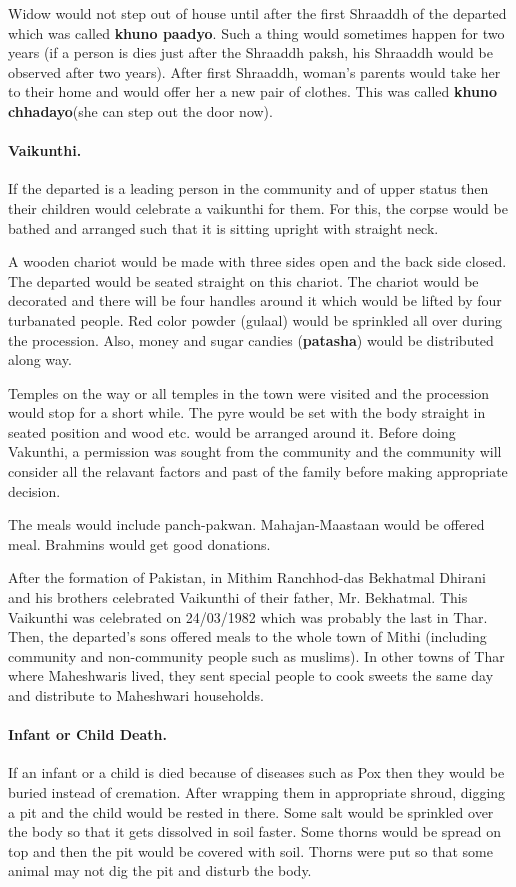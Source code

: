 Widow would not step out of house until after the first Shraaddh of the
departed which was called \textbf{khuno paadyo}. Such a thing would sometimes
happen for two years (if a person is dies just after the Shraaddh paksh, his
Shraaddh would be observed after two years). After first Shraaddh, woman's
parents would take her to their home and would offer her a new pair of clothes.
This was called \textbf{khuno chhadayo}(she can step out the door now). 

\paragraph{Vaikunthi.} If the departed is a leading person in the community and
of upper status then their children would celebrate a vaikunthi for them. For
this, the corpse would be bathed and arranged such that it is sitting upright
with straight neck. 

A wooden chariot would be made with three sides open and the back side closed.
The departed would be seated straight on this chariot. The chariot would be
decorated and there will be four handles around it which would be lifted by
four turbanated people. Red color powder (gulaal) would be sprinkled all over
during the procession. Also, money and sugar candies (\textbf{patasha}) would
be distributed along way.

Temples on the way or all temples in the town were visited and the procession
would stop for a short while. The pyre would be set with the body straight in
seated position and wood etc. would be arranged around it. Before doing
Vakunthi, a permission was sought from the community and the community will
consider all the relavant factors and past of the family before making
appropriate decision.

The meals would include panch-pakwan. Mahajan-Maastaan would be offered meal.
Brahmins would get good donations.

After the formation of Pakistan, in Mithim Ranchhod-das Bekhatmal Dhirani and
his brothers celebrated Vaikunthi of their father, Mr. Bekhatmal. This
Vaikunthi was celebrated on 24/03/1982 which was probably the last in Thar.
Then, the departed's sons offered meals to the whole town of Mithi (including
community and non-community people such as muslims). In other towns of Thar
where Maheshwaris lived, they sent special people to cook sweets the same day
and distribute to Maheshwari households.

\paragraph{Infant or Child Death.} If an infant or a child is died because of
diseases such as Pox then they would be buried instead of cremation. After
wrapping them in appropriate shroud, digging a pit and the child would be
rested in there. Some salt would be sprinkled over the body so that it gets
dissolved in soil faster. Some thorns would be spread on top and then the pit
would be covered with soil. Thorns were put so that some animal may not dig the
pit and disturb the body.

